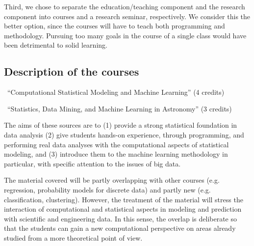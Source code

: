 Third, we chose to separate the education/teaching component and the
research component into courses and a research seminar, respectively. We
consider this the better option, since the courses will have to teach
both programming and methodology. Pursuing too many goals in the
course of a single class would have been detrimental to solid learning.
 

\subsection{Description of the courses}
\label{sec:course-descr}

\bits
\item \statcl~``Computational Statistical Modeling and Machine Learning'' (4 credits)
\item \astrocl~``Statistics, Data Mining, and Machine Learning in Astronomy'' (3 credits)
\eits

The aims of these sources are to (1) provide a strong statistical
foundation in data analysis (2) give students hands-on experience,
through programming, and performing real data analyses with the
computational aspects of statistical modeling, and (3) introduce them
to the machine learning methodology in particular, with specific
attention to the issues of big data.

The material covered will be partly overlapping with other courses
(e.g. regression, probability models for discrete data) and partly new
(e.g. classification, clustering). However, the treatment of the
material will stress the interaction of computational and
statistical aspects in modeling and prediction with scientific and
engineering data. In this sense, the overlap is deliberate
so that the students can gain a new computational perspective on areas
already studied from a more theoretical point of view. 

